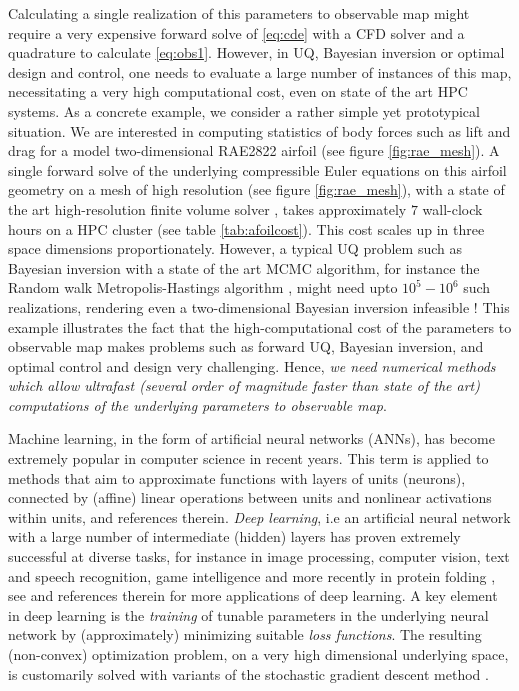 \documentclass[a4paper]{article}
\numberwithin{equation}{section}
\numberwithin{equation}{section}
\theoremstyle{definition}
\theoremstyle{myremarkstyle}
\begin{document}
Calculating a single realization of this parameters to observable map might require a very expensive forward solve of \eqref{eq:cde} with a CFD solver and a quadrature to calculate \eqref{eq:obs1}. However, in UQ, Bayesian inversion or optimal design and control, one needs to evaluate a large number of instances of this map, necessitating a very high computational cost, even on state of the art HPC systems. As a concrete example, we consider a rather simple yet prototypical situation. We are interested in computing statistics of body forces such as lift and drag for a model two-dimensional RAE2822 airfoil \cite{UMRIDA} (see figure \ref{fig:rae_mesh}). A single forward solve of the underlying compressible Euler equations on this airfoil geometry on a mesh of high resolution (see figure \ref{fig:rae_mesh}), with a state of the art high-resolution finite volume solver \cite{RCFM}, takes approximately $7$ wall-clock hours on a HPC cluster (see table \ref{tab:afoilcost}). This cost scales up in three space dimensions proportionately. However, a typical UQ problem such as Bayesian inversion with a state of the art MCMC algorithm, for instance the Random walk Metropolis-Hastings algorithm \cite{STU1}, might need upto $10^5-10^6$ such realizations, rendering even a two-dimensional Bayesian inversion infeasible ! This example illustrates the fact that the high-computational cost of the parameters to observable map makes problems such as forward UQ, Bayesian inversion, and optimal control and design very challenging. Hence, \emph{we need numerical methods which allow ultrafast (several order of magnitude faster than state of the art) computations of the underlying parameters to observable map}.

Machine learning, in the form of artificial neural networks (ANNs), has become extremely popular in computer science in recent years. This term is applied to methods that aim to approximate functions with layers of
units (neurons), connected by (affine) linear operations between units and nonlinear activations within units, \cite{DLbook} and references therein. \emph{Deep learning}, i.e an artificial neural network with a large number of intermediate (hidden) layers has proven extremely successful at diverse tasks, for instance in image processing, computer vision, text and speech recognition, game intelligence and more recently in protein folding \cite{AFOL}, see \cite{DL-nat} and references therein for more applications of deep learning. A key element in deep learning is the \emph{training} of tunable parameters in the underlying neural network by (approximately) minimizing suitable \emph{loss functions}. The resulting (non-convex) optimization problem, on a very high dimensional underlying space, is customarily solved with variants of the stochastic gradient descent method \cite{SG}.
\end{document}
